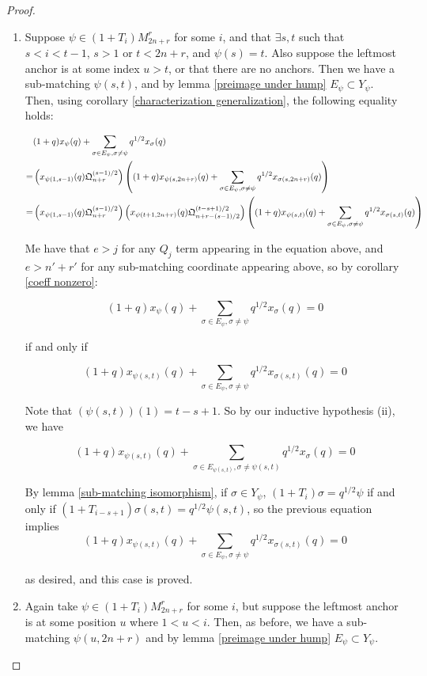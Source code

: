 \documentclass{amsart}
\begin{document}
\begin{proof}
	\begin{enumerate}[label={case \arabic*:}]
		\item Suppose $\psi\in (1+T_i)M_{2n+r}^r$ for some $i$, and that $\exists s,t$ such that $s<i<t-1$, $s>1$ or $t<2n+r$, and $\psi(s)=t$. Also suppose the leftmost anchor is at some index $u>t$, or that there are no anchors. Then we have a sub-matching $\psi(s,t)$, and by lemma \ref{preimage under hump} $E_\psi\subset Y_\psi$. Then, using corollary \ref{characterization generalization}, the following equality holds:
		
		\begin{align*}
		&(1+q)x_\psi(q)+\sum_{\sigma\in E_\psi,\sigma\not=\psi}q^{1/2}x_\sigma(q)\\
		=&\left( x_{\psi(1,s-1)}(q)\mathfrak{Q}_{n+r}^{(s-1)/2} \right)\left( (1+q)x_{\psi(s,2n+r)}(q)+\sum_{\sigma\in E_\psi,\sigma\not=\psi}q^{1/2}x_{\sigma(s,2n+r)}(q) \right)\\
		=&\left( x_{\psi(1,s-1)}(q)\mathfrak{Q}_{n+r}^{(s-1)/2} \right)\left( x_{\psi(t+1,2n+r)}(q)\mathfrak{Q}_{n+r-(s-1)/2}^{(t-s+1)/2} \right)\left( (1+q)x_{\psi(s,t)}(q)+\sum_{\sigma\in E_\psi,\sigma\not=\psi}q^{1/2}x_{\sigma(s,t)}(q) \right)
		\end{align*}
		
		Me have that $e>j$ for any $Q_j$ term appearing in the equation above, and $e>n'+r'$ for any sub-matching coordinate appearing above, so by corollary \ref{coeff nonzero}:
		
		$$(1+q)x_\psi(q)+\sum_{\sigma\in E_\psi,\sigma\not=\psi}q^{1/2}x_\sigma(q)=0$$
		
		if and only if
		
		$$(1+q)x_{\psi(s,t)}(q)+\sum_{\sigma\in E_\psi,\sigma\not=\psi}q^{1/2}x_{\sigma(s,t)}(q)=0$$
		
		Note that $(\psi(s,t))(1)=t-s+1$. So by our inductive hypothesis (ii), we have 
		
		$$(1+q)x_{\psi(s,t)}(q)+\sum_{\sigma\in E_{\psi(s,t)},\sigma\not=\psi(s,t)}q^{1/2}x_{\sigma}(q)=0$$
		
		By lemma \ref{sub-matching isomorphism}, if $\sigma\in Y_\psi$, $(1+T_i)\sigma=q^{1/2}\psi$ if and only if $(1+T_{i-s+1})\sigma(s,t)=q^{1/2}\psi(s,t)$, so the previous equation implies $$(1+q)x_{\psi(s,t)}(q)+\sum_{\sigma\in E_\psi,\sigma\not=\psi}q^{1/2}x_{\sigma(s,t)}(q)=0$$
		
		as desired, and this case is proved.
		
		\vspace{5mm}
		\item Again take $\psi\in (1+T_i)M_{2n+r}^r$ for some $i$, but suppose the leftmost anchor is at some position $u$ where $1<u<i$. Then, as before, we have a sub-matching $\psi(u,2n+r)$ and by lemma \ref{preimage under hump} $E_\psi\subset Y_\psi$.
		

\end{enumerate}
\end{proof}
\end{document}
